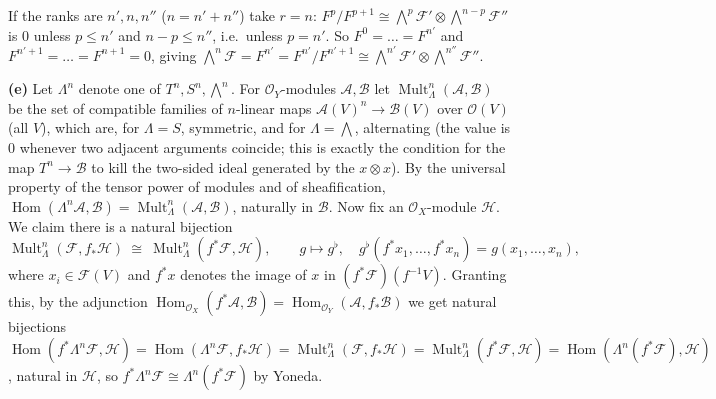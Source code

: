 \documentclass[11pt]{article}
\begin{document}
If the ranks are $n',n,n''$ ($n=n'+n''$) take $r=n$: $F^p/F^{p+1}\cong\bigwedge^p\mathcal F'\otimes\bigwedge^{n-p}\mathcal F''$ is $0$ unless $p\le n'$ and $n-p\le n''$, i.e.\ unless $p=n'$. So $F^0=\dots=F^{n'}$ and $F^{n'+1}=\dots=F^{n+1}=0$, giving $\bigwedge^n\mathcal F=F^{n'}=F^{n'}/F^{n'+1}\cong\bigwedge^{n'}\mathcal F'\otimes\bigwedge^{n''}\mathcal F''$.

\textbf{(e)} Let $\Lambda^n$ denote one of $T^n,S^n,\bigwedge^n$. For $\mathcal O_Y$-modules $\mathcal A,\mathcal B$ let $\operatorname{Mult}^n_\Lambda(\mathcal A,\mathcal B)$ be the set of compatible families of $n$-linear maps $\mathcal A(V)^n\to\mathcal B(V)$ over $\mathcal O(V)$ (all $V$), which are, for $\Lambda=S$, symmetric, and for $\Lambda=\bigwedge$, alternating (the value is $0$ whenever two adjacent arguments coincide; this is exactly the condition for the map $T^n\to\mathcal B$ to kill the two-sided ideal generated by the $x\otimes x$). By the universal property of the tensor power of modules and of sheafification, $\operatorname{Hom}(\Lambda^n\mathcal A,\mathcal B)=\operatorname{Mult}^n_\Lambda(\mathcal A,\mathcal B)$, naturally in $\mathcal B$. Now fix an $\mathcal O_X$-module $\mathcal H$. We claim there is a natural bijection
\[
\operatorname{Mult}^n_\Lambda(\mathcal F,f_*\mathcal H)\ \cong\ \operatorname{Mult}^n_\Lambda(f^*\mathcal F,\mathcal H),\qquad g\mapsto g^\flat,\quad g^\flat(f^*x_1,\dots,f^*x_n)=g(x_1,\dots,x_n),
\]
where $x_i\in\mathcal F(V)$ and $f^*x$ denotes the image of $x$ in $(f^*\mathcal F)(f^{-1}V)$. Granting this, by the adjunction $\operatorname{Hom}_{\mathcal O_X}(f^*\mathcal A,\mathcal B)=\operatorname{Hom}_{\mathcal O_Y}(\mathcal A,f_*\mathcal B)$ we get natural bijections $\operatorname{Hom}(f^*\Lambda^n\mathcal F,\mathcal H)=\operatorname{Hom}(\Lambda^n\mathcal F,f_*\mathcal H)=\operatorname{Mult}_\Lambda^n(\mathcal F,f_*\mathcal H)=\operatorname{Mult}_\Lambda^n(f^*\mathcal F,\mathcal H)=\operatorname{Hom}(\Lambda^n(f^*\mathcal F),\mathcal H)$, natural in $\mathcal H$, so $f^*\Lambda^n\mathcal F\cong\Lambda^n(f^*\mathcal F)$ by Yoneda.
\end{document}
